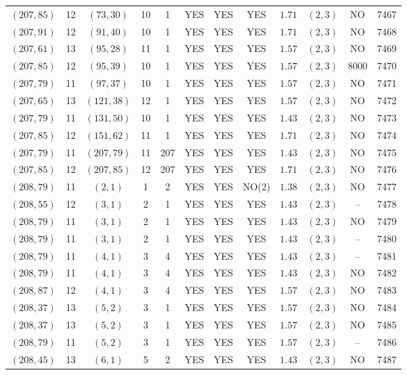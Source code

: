 \begin{longtable}{|c|c|c|c|c|c|c|c|c|c|c|c|}
$(207,85)$ & 12 & $(73,30)$ & 10 & 1 & YES & YES & YES & $1.71$ & $(2,3)$ & NO & 7467\\
$(207,91)$ & 12 & $(91,40)$ & 10 & 1 & YES & YES & YES & $1.71$ & $(2,3)$ & NO & 7468\\
$(207,61)$ & 13 & $(95,28)$ & 11 & 1 & YES & YES & YES & $1.57$ & $(2,3)$ & NO & 7469\\
$(207,85)$ & 12 & $(95,39)$ & 10 & 1 & YES & YES & YES & $1.57$ & $(2,3)$ & 8000 & 7470\\
$(207,79)$ & 11 & $(97,37)$ & 10 & 1 & YES & YES & YES & $1.57$ & $(2,3)$ & NO & 7471\\
$(207,65)$ & 13 & $(121,38)$ & 12 & 1 & YES & YES & YES & $1.57$ & $(2,3)$ & NO & 7472\\
$(207,79)$ & 11 & $(131,50)$ & 10 & 1 & YES & YES & YES & $1.43$ & $(2,3)$ & NO & 7473\\
$(207,85)$ & 12 & $(151,62)$ & 11 & 1 & YES & YES & YES & $1.71$ & $(2,3)$ & NO & 7474\\
$(207,79)$ & 11 & $(207,79)$ & 11 & 207 & YES & YES & YES & $1.43$ & $(2,3)$ & NO & 7475\\
$(207,85)$ & 12 & $(207,85)$ & 12 & 207 & YES & YES & YES & $1.71$ & $(2,3)$ & NO & 7476\\
$(208,79)$ & 11 & $(2,1)$ & 1 & 2 & YES & YES & NO(2) & $1.38$ & $(2,3)$ & NO & 7477\\
$(208,55)$ & 12 & $(3,1)$ & 2 & 1 & YES & YES & YES & $1.43$ & $(2,3)$ & -- & 7478\\
$(208,79)$ & 11 & $(3,1)$ & 2 & 1 & YES & YES & YES & $1.43$ & $(2,3)$ & NO & 7479\\
$(208,79)$ & 11 & $(3,1)$ & 2 & 1 & YES & YES & YES & $1.43$ & $(2,3)$ & -- & 7480\\
$(208,79)$ & 11 & $(4,1)$ & 3 & 4 & YES & YES & YES & $1.43$ & $(2,3)$ & -- & 7481\\
$(208,79)$ & 11 & $(4,1)$ & 3 & 4 & YES & YES & YES & $1.43$ & $(2,3)$ & NO & 7482\\
$(208,87)$ & 12 & $(4,1)$ & 3 & 4 & YES & YES & YES & $1.57$ & $(2,3)$ & NO & 7483\\
$(208,37)$ & 13 & $(5,2)$ & 3 & 1 & YES & YES & YES & $1.57$ & $(2,3)$ & NO & 7484\\
$(208,37)$ & 13 & $(5,2)$ & 3 & 1 & YES & YES & YES & $1.57$ & $(2,3)$ & NO & 7485\\
$(208,79)$ & 11 & $(5,2)$ & 3 & 1 & YES & YES & YES & $1.57$ & $(2,3)$ & -- & 7486\\
$(208,45)$ & 13 & $(6,1)$ & 5 & 2 & YES & YES & YES & $1.43$ & $(2,3)$ & NO & 7487\\

\end{longtable}
